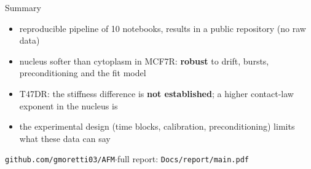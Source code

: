 \documentclass[aspectratio=169,10pt]{beamer}
\begin{document}
\begin{frame}{Summary}
\begin{itemize}
\item reproducible pipeline of 10 notebooks, results in a public repository (no raw data)
\item nucleus softer than cytoplasm in MCF7R: \textbf{robust} to drift, bursts, preconditioning and the fit model
\item T47DR: the stiffness difference is \textbf{not established}; a higher contact-law exponent in the nucleus is
\item the experimental design (time blocks, calibration, preconditioning) limits what these data can say
\end{itemize}
\bigskip
\centering
\footnotesize \texttt{github.com/gmoretti03/AFM}\quad $\cdot$\quad full report: \texttt{Docs/report/main.pdf}
\end{frame}
\end{document}
